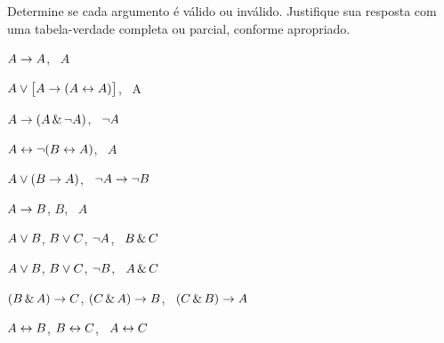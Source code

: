 \solutions
\problempart
\label{pr.TT.valid}
Determine se cada argumento é válido ou inválido. Justifique sua resposta com uma tabela-verdade completa ou parcial, conforme apropriado.
\begin{earg}
\item $A\rightarrow A$, \therefore\ $A$ %
\item $A\vee\bigl[A\rightarrow(A\leftrightarrow A)\bigr]$, \therefore\ A %
\item $A\rightarrow(A\,\&\,\neg A)$, \therefore\ $\neg A$ %
\item $A\leftrightarrow\neg(B\leftrightarrow A)$, \therefore\ $A$ %
\item $A\vee(B\rightarrow A)$, \therefore\ $\neg A \rightarrow \neg B$ %
\item $A\rightarrow B$, $B$, \therefore\ $A$ %
\item $A\vee B$, $B\vee C$, $\neg A$, \therefore\ $B \,\&\, C$ %
\item $A\vee B$, $B\vee C$, $\neg B$, \therefore\ $A \,\&\, C$ %
\item $(B\,\&\, A)\rightarrow C$, $(C\,\&\, A)\rightarrow B$, \therefore\ $(C\,\&\, B)\rightarrow A$ %
\item $A\leftrightarrow B$, $B\leftrightarrow C$, \therefore\ $A\leftrightarrow C$ %
\end{earg}

